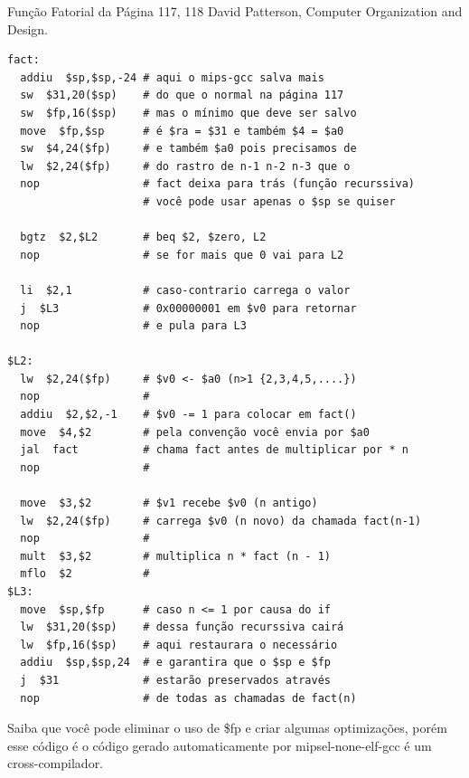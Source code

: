 \documentclass{article}
\begin{document}
\pagebreak
Função Fatorial da Página 117, 118 David Patterson, Computer Organization and
Design.
\begin{verbatim}
fact:
  addiu  $sp,$sp,-24 # aqui o mips-gcc salva mais
  sw  $31,20($sp)    # do que o normal na página 117
  sw  $fp,16($sp)    # mas o mínimo que deve ser salvo
  move  $fp,$sp      # é $ra = $31 e também $4 = $a0
  sw  $4,24($fp)     # e também $a0 pois precisamos de
  lw  $2,24($fp)     # do rastro de n-1 n-2 n-3 que o
  nop                # fact deixa para trás (função recurssiva)
                     # você pode usar apenas o $sp se quiser

  bgtz  $2,$L2       # beq $2, $zero, L2
  nop                # se for mais que 0 vai para L2

  li  $2,1           # caso-contrario carrega o valor
  j  $L3             # 0x00000001 em $v0 para retornar
  nop                # e pula para L3

$L2:
  lw  $2,24($fp)     # $v0 <- $a0 (n>1 {2,3,4,5,....})
  nop                #
  addiu  $2,$2,-1    # $v0 -= 1 para colocar em fact()
  move  $4,$2        # pela convenção você envia por $a0
  jal  fact          # chama fact antes de multiplicar por * n
  nop                #

  move  $3,$2        # $v1 recebe $v0 (n antigo)
  lw  $2,24($fp)     # carrega $v0 (n novo) da chamada fact(n-1)
  nop                #
  mult  $3,$2        # multiplica n * fact (n - 1)
  mflo  $2           #
$L3:
  move  $sp,$fp      # caso n <= 1 por causa do if
  lw  $31,20($sp)    # dessa função recurssiva cairá
  lw  $fp,16($sp)    # aqui restaurara o necessário
  addiu  $sp,$sp,24  # e garantira que o $sp e $fp
  j  $31             # estarão preservados através
  nop                # de todas as chamadas de fact(n)
\end{verbatim}

Saiba que você pode eliminar o uso de \$fp e criar algumas optimizações, porém
esse código é o código gerado automaticamente por mipsel-none-elf-gcc é um
cross-compilador.


\clearpage
\end{document}

